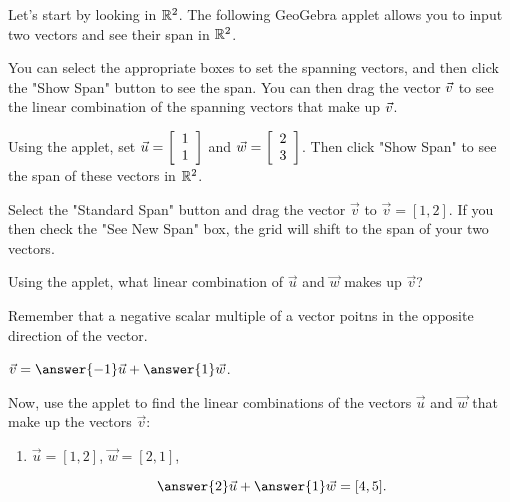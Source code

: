 \documentclass{ximera}
\begin{document}
\begin{exploration}

Let's start by looking in $\R^2$. The following GeoGebra applet allows you to input two vectors and see their span in $\R^2$. 

You can select the appropriate boxes to set the spanning vectors, and then click the "Show Span" button to see the span. You can then drag the vector $\vect{v}$ to see the linear combination of the spanning vectors that make up $\vect{v}$.

\begin{example}

  Using the applet, set $\vect{u}=\startmat{r} 1 \\ 1 \stopmat$ and $\vec{w}=\startmat{r} 2 \\ 3 \stopmat$. Then click "Show Span" to see the span of these vectors in $\R^2$.

  Select the "Standard Span" button and drag the vector $\vec{v}$ to $\vec{v}=[1,2]$. If you then check the "See New Span" box, the grid will shift to the span of your two vectors. 
  
  Using the applet, what linear combination of $\vec{u}$ and $\vec{w}$ makes up $\vec{v}$?

  \begin{hint}
  
    Remember that a negative scalar multiple of a vector poitns in the opposite direction of the vector.

  \end{hint}

  \begin{solution}
  
    $\vec{v}=\answer{-1}\vec{u}+\answer{1}\vec{w}$.

  \end{solution}

\end{example}

\begin{example}

  Now, use the applet to find the linear combinations of the vectors $\vec{u}$ and $\vec{w}$ that make up the vectors $\vec{v}$:

  \begin{enumerate}
  
    \item $\vec{u}=[1,2]$, $\vec{w}=[2,1]$, 
    
    $$\answer{2}\vec{u}+\answer{1}\vec{w}=[4,5].$$


\end{enumerate}
\end{example}
\end{exploration}
\end{document}
